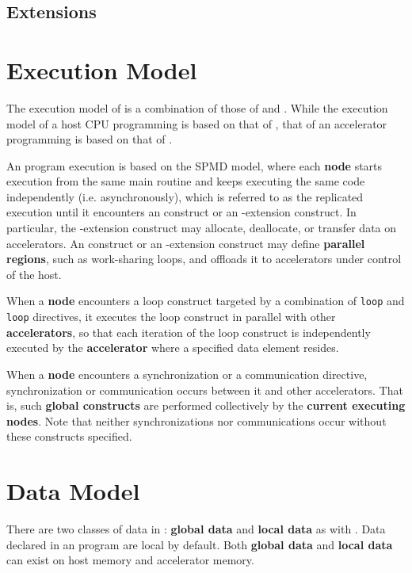 \subsection{{\OACC} Extensions}

\section{Execution Model}
The execution model of {\XACC} is a combination of those of {\XMP} and {\OACC}.
While the execution model of a host CPU programming is based on that of {\XMP},
that of an accelerator programming is based on that of {\OACC}.

An {\XACC} program execution is based on the SPMD model, 
where each {\bf node} starts execution from the same main routine and keeps executing the same code independently (i.e. asynchronously), 
which is referred to as the replicated execution
until it encounters an {\XMP} construct or an {\XMP}-extension construct.
In particular,
the {\XMP}-extension construct may allocate, deallocate, or transfer data on accelerators.
An {\OACC} construct or an {\OACC}-extension construct may define {\bf parallel regions}, such as work-sharing loops, 
and offloads it to accelerators under control of the host.

When a {\bf node} encounters a loop construct 
targeted by a combination of {\XMP} {\tt loop} and {\OACC} {\tt loop} directives,
it executes the loop construct in parallel with other {\bf accelerators},
so that each iteration of the loop construct is independently executed by the {\bf accelerator}
where a specified data element resides.

When a {\bf node} encounters a {\XACC} synchronization or a {\XACC} communication directive,
synchronization or communication occurs between it and other accelerators.
That is, such {\bf global constructs} are performed collectively by the {\bf current executing nodes}.
Note that neither synchronizations nor communications occur without these constructs specified.

\section{Data Model}
There are two classes of data in {\XACC}: {\bf global data} and {\bf local data} as with {\XMP}. 
Data declared in an {\XACC} program are local by default.
Both {\bf global data} and {\bf local data} can exist on host memory and accelerator memory.

